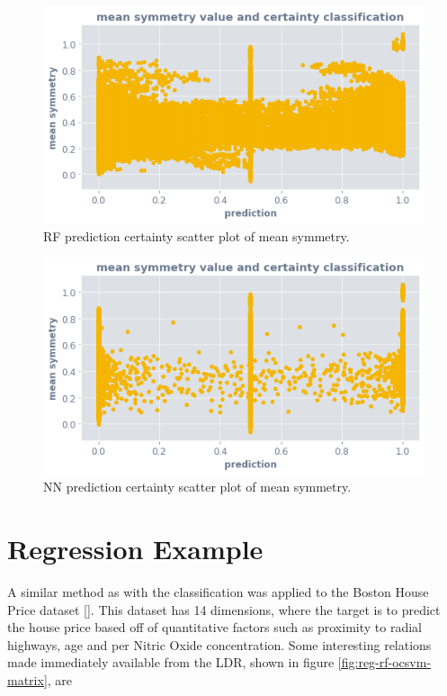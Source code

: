 \documentclass[a4paperpaper,twocolumn]{article}
\begin{document}
\begin{figure}
\centering
\includegraphics[width=\columnwidth]{img/rf_ocsvm_mean_symmetry.png}
\caption{RF prediction certainty scatter plot of mean symmetry.}
\label{fig:nn-ocsvm-mean-symmetry-scatter}
\end{figure}

\begin{figure}
\centering
\includegraphics[width=\columnwidth]{img/nn_ocsvm_mean_symmetry.png}
\caption{NN prediction certainty scatter plot of mean symmetry.}
\label{fig:nn-ocsvm-mean-symmetry-scatter}
\end{figure}

\section{Regression Example}

A similar method as with the classification was applied to the Boston House Price dataset []. This dataset has 14 dimensions, where the target is to predict the house price based off of quantitative factors such as proximity to radial highways, age and per Nitric Oxide concentration. Some interesting relations made immediately available from the LDR, shown in figure \ref{fig:reg-rf-ocsvm-matrix}, are
\end{document}
